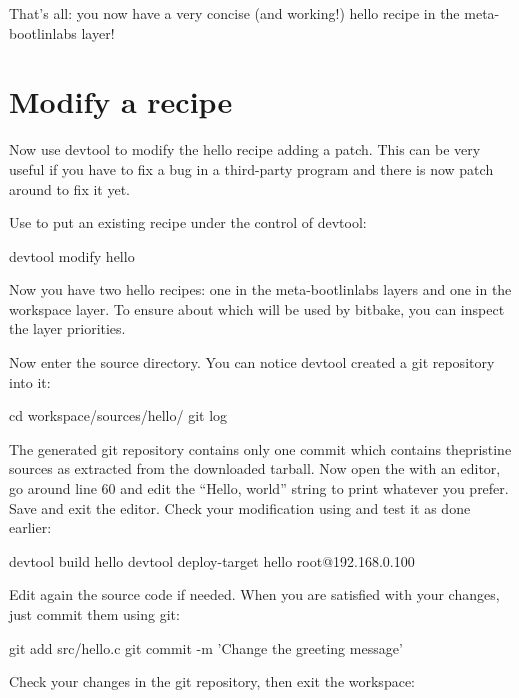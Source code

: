 That's all: you now have a very concise (and working!) hello recipe in the
meta-bootlinlabs layer!

\section{Modify a recipe}

Now use devtool to modify the hello recipe adding a patch. This can be very
useful if you have to fix a bug in a third-party program and there is now
patch around to fix it yet.

Use  to put an existing recipe under the control of devtool:
\begin{bashinput}
devtool modify hello
\end{bashinput}

Now you have two hello recipes: one in the meta-bootlinlabs layers and one
in the workspace layer. To ensure about which will be used by bitbake, you
can inspect the layer priorities.

Now enter the source directory. You can notice devtool created a git
repository into it:

\begin{bashinput}
cd workspace/sources/hello/
git log
\end{bashinput}

The generated git repository contains only one commit which contains
thepristine sources as extracted from the downloaded tarball.  Now open the
 with an editor, go around line 60 and edit the ``Hello,
world'' string to print whatever you prefer. Save and exit the
editor. Check your modification using  and
test it as done earlier:

\begin{bashinput}
devtool build hello
devtool deploy-target hello root@192.168.0.100
\end{bashinput}

Edit again the source code if needed. When you are satisfied with your
changes, just commit them using git:

\begin{bashinput}
git add src/hello.c
git commit -m 'Change the greeting message'
\end{bashinput}

Check your changes in the git repository, then exit the workspace:


